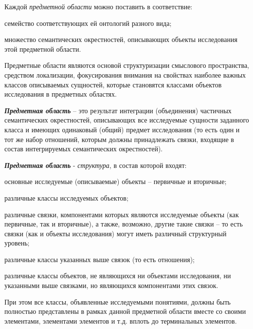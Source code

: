 Каждой \textit{предметной области} можно поставить в соответствие:
\begin{textitemize}
	\item {семейство соответствующих ей онтологий разного вида};
	\item {множество семантических окрестностей, описывающих объекты исследования этой предметной области}.
\end{textitemize}

Предметные области являются основой структуризации смыслового пространства, средством локализации, фокусирования внимания на свойствах наиболее важных классов описываемых сущностей, которые становятся классами объектов исследования в предметных областях.

\begin{SCn}
\end{SCn}	

\bigskip
\textbf{\textit{Предметная область}} -- это результат интеграции (объединения) частичных семантических окрестностей, описывающих все исследуемые сущности заданного класса и имеющих одинаковый (общий) предмет исследования (то есть один и тот же набор отношений, которым должны принадлежать связки, входящие в состав интегрируемых семантических окрестностей).

\textbf{\textit{Предметная область}} -\textit{ структура}, в состав которой входят:
\begin{textitemize}
	\item основные исследуемые (описываемые) объекты – первичные и вторичные;
	\item различные классы исследуемых объектов;
	\item различные связки, компонентами которых являются исследуемые объекты (как первичные, так и вторичные), а также, возможно, другие такие связки – то есть связки (как и объекты исследования) могут иметь различный структурный уровень;
	\item различные классы указанных выше связок (то есть отношения);
	\item различные классы объектов, не являющихся ни объектами исследования, ни указанными выше связками, но являющихся компонентами этих связок.
\end{textitemize}

При этом все классы, объявленные исследуемыми понятиями, должны быть полностью представлены в рамках данной предметной области вместе со своими элементами, элементами элементов и т.д. вплоть до терминальных элементов.

